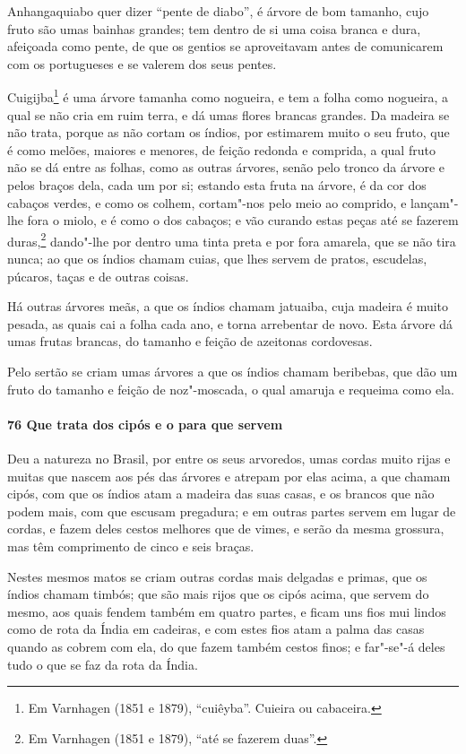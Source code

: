 Anhangaquiabo quer dizer ``pente de diabo'', é árvore de bom tamanho, cujo fruto são umas
bainhas grandes; tem dentro de si uma coisa branca e dura, afeiçoada como pente, de que os
gentios se aproveitavam antes de comunicarem com os portugueses e se valerem dos seus
pentes.

Cuigijba\footnote{ Em Varnhagen (1851 e 1879), ``cuiêyba''. Cuieira ou cabaceira.} é uma
árvore tamanha como nogueira, e tem a folha como nogueira, a qual se não cria em ruim
terra, e dá umas flores brancas grandes. Da madeira se não trata, porque as não cortam os
índios, por estimarem muito o seu fruto, que é como melões, maiores e menores, de feição
redonda e comprida, a qual fruto não se dá entre as folhas, como as outras árvores, senão
pelo tronco da árvore e pelos braços dela, cada um por si; estando esta fruta na árvore, é
da cor dos cabaços verdes, e como os colhem, cortam"-nos pelo meio ao comprido, e
lançam"-lhe fora o miolo, e é como o dos cabaços; e vão curando estas peças até se fazerem
duras,\footnote{ Em Varnhagen (1851 e 1879), ``até se fazerem duas''.} dando"-lhe por
dentro uma tinta preta e por fora amarela, que se não tira nunca; ao que os índios chamam
cuias, que lhes servem de pratos, escudelas, púcaros, taças e de outras coisas.

Há outras árvores meãs, a que os índios chamam jatuaiba, cuja madeira é muito pesada, as
quais cai a folha cada ano, e torna arrebentar de novo. Esta árvore dá umas frutas
brancas, do tamanho e feição de azeitonas cordovesas.

Pelo sertão se criam umas árvores a que os índios chamam beribebas, que dão um fruto do
tamanho e feição de noz"-moscada, o qual amaruja e requeima como ela.

\paragraph{76 Que trata dos cipós e o para que servem}

Deu a natureza no Brasil, por entre os seus arvoredos, umas cordas muito rijas e muitas
que nascem aos pés das árvores e atrepam por elas acima, a que chamam cipós, com que os
índios atam a madeira das suas casas, e os brancos que não podem mais, com que escusam
pregadura; e em outras partes servem em lugar de cordas, e fazem deles cestos melhores que
de vimes, e serão da mesma grossura, mas têm comprimento de cinco e seis braças.

Nestes mesmos matos se criam outras cordas mais delgadas e primas, que os índios chamam
timbós; que são mais rijos que os cipós acima, que servem do mesmo, aos quais fendem
também em quatro partes, e ficam uns fios mui lindos como de rota da Índia em cadeiras, e
com estes fios atam a palma das casas quando as cobrem com ela, do que fazem também cestos
finos; e far"-se"-á deles tudo o que se faz da rota da Índia.

